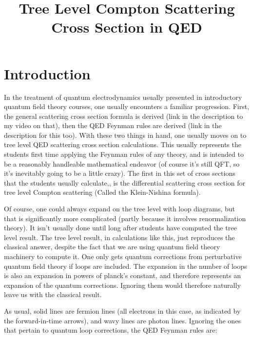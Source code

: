\documentclass[a4]{article}
\begin{document}
    \title{Tree Level Compton Scattering Cross Section in QED}
    \maketitle

    \section*{Introduction}

    In the treatment of quantum electrodynamics usually presented in introductory quantum field theory courses, one usually
    encounters a familiar progression. First, the general scattering cross section formula is derived (link in the description to my video on
    that), then the QED Feynman rules are derived (link in the description for this too). With these two things in hand, one usually moves
    on to tree level QED scattering cross section calculations. This usually represents the students first time applying the Feynman rules
    of any theory, and is intended to be a reasonably handleable mathematical endeavor (of course it's still QFT, so it's inevitably going
    to be a little crazy). The first in this set of cross sections that the students usually calculate,, is the differential scattering cross section for
    tree level Compton scattering (Called the Klein-Nishina formula).

    Of course, one could always expand on the tree level with loop diagrams, but that is significantly more complicated (partly because 
    it involves renormalization theory). It isn't usually done until long after students have computed the tree level result. The tree level
    result, in calculations like this, just reproduces the classical answer, despite the fact that we are using quantum field theory 
    machinery to compute it. One only gets quantum corrections from perturbative quantum field theory if loops are included. The
    expansion in the number of loops is also an expansion in powers of planck's constant, and therefore represents an expansion of the
    quantum corrections. Ignoring them would therefore naturally leave us with the classical result. 

    As usual, solid lines are fermion lines (all electrons in this case, as indicated by the forward-in-time arrows), and wavy lines are
    photon lines. Ignoring the ones that pertain to quantum loop corrections, the QED Feynman rules are:
\end{document}
